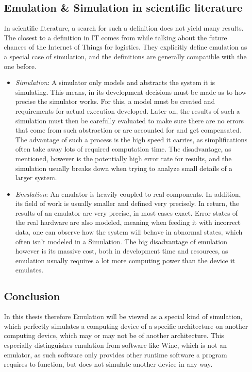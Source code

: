 \subsection{Emulation \& Simulation in scientific literature}
In scientific literature, a search for such a definition does not yield many results.
The closest to a definition in IT comes from 
while talking about the future chances of the Internet of Things for logistics\cite{definition_iot}.
They explicitly define emulation as a special case of simulation,
and the definitions are generally compatible with the one before.
\begin{itemize}
    \item \emph{Simulation}: A simulator only models and abstracts the system it is simulating.
    This means, in its development decisions must be made as to how precise the simulator works.
    For this, a model must be created and requirements for actual execution developed.
    Later on, the results of such a simulation must then be carefully evaluated to make sure
    there are no errors that come from such abstraction
    or are accounted for and get compensated.
    The advantage of such a process is the high speed it carries,
    as simplifications often take away lots of required computation time.
    The disadvantage, as mentioned, however is the potentially high error rate for results,
    and the simulation usually breaks down when trying to analyze small details of a larger system\cite{definition_iot}.
    \item \emph{Emulation}: An emulator is heavily coupled to real components.
    In addition, its field of work is usually smaller and defined very precisely.
    In return, the results of an emulator are very precise, in most cases exact.
    Error states of the real hardware are also modeled, meaning when feeding it with incorrect data,
    one can observe how the system will behave in abnormal states, which often isn't modeled in a Simulation.
    The big disadvantage of emulation however is its massive cost,
    both in development time and resources,
    as emulation usually requires a lot more computing power than the device it emulates\cite{definition_iot}.
\end{itemize}

\subsection{Conclusion}\label{sec:conclusion_emulation}
In this thesis therefore Emulation will be viewed as a special kind of simulation,
which perfectly simulates a computing device of a specific architecture
on another computing device, which may or may not be of another architecture.
This especially distinguishes emulation from software like Wine, which is not an emulator,
as such software only provides other runtime software a program requires to function, but does not simulate another device in any way\cite{wine}.


